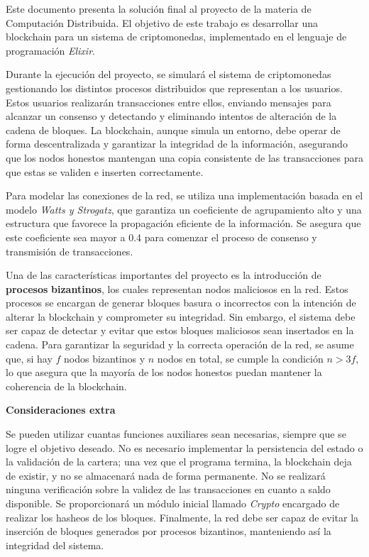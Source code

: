 \vspace{-.6cm}
{\large {
    Este documento presenta la solución final al proyecto de la materia de Computación Distribuida. El objetivo de este trabajo es desarrollar una blockchain para un sistema de criptomonedas, implementado en el lenguaje de programación \textit{Elixir}. \vspace{.6cm}

    Durante la ejecución del proyecto, se simulará el sistema de criptomonedas gestionando los distintos procesos distribuidos que representan a los usuarios. Estos usuarios realizarán transacciones entre ellos, enviando mensajes para alcanzar un consenso y detectando y eliminando intentos de alteración de la cadena de bloques. La blockchain, aunque simula un entorno, debe operar de forma descentralizada y garantizar la integridad de la información, asegurando que los nodos honestos mantengan una copia consistente de las transacciones para que estas se validen e inserten correctamente. \vspace{.6cm}

    Para modelar las conexiones de la red, se utiliza una implementación basada en el modelo \textit{Watts y Strogatz}, que garantiza un coeficiente de agrupamiento alto y una estructura que favorece la propagación eficiente de la información. Se asegura que este coeficiente sea mayor a 0.4 para comenzar el proceso de consenso y transmisión de transacciones. \vspace{.6cm}

    Una de las características importantes del proyecto es la introducción de \textbf{procesos} \textbf{bizantinos}, los cuales representan nodos maliciosos en la red. Estos procesos se encargan de generar bloques basura o incorrectos con la intención de alterar la blockchain y comprometer su integridad. Sin embargo, el sistema debe ser capaz de detectar y evitar que estos bloques maliciosos sean insertados en la cadena. Para garantizar la seguridad y la correcta operación de la red, se asume que, si hay $f$ nodos bizantinos y $n$ nodos en total, se cumple la condición $ n > 3f $, lo que asegura que la mayoría de los nodos honestos puedan mantener la coherencia de la blockchain. \vspace{.6cm}

    \textbf{Consideraciones extra}  \vspace{.6cm}

    Se pueden utilizar cuantas funciones auxiliares sean necesarias, siempre que se logre el objetivo deseado. No es necesario implementar la persistencia del estado o la validación de la cartera; una vez que el programa termina, la blockchain deja de existir, y no se almacenará nada de forma permanente. No se realizará ninguna verificación sobre la validez de las transacciones en cuanto a saldo disponible. Se proporcionará un módulo inicial llamado \textit{Crypto} encargado de realizar los hasheos de los bloques. Finalmente, la red debe ser capaz de evitar la inserción de bloques generados por procesos bizantinos, manteniendo así la integridad del sistema.
}}